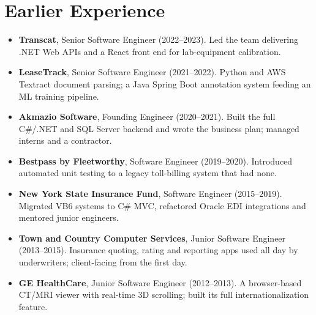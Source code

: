 \documentclass[10pt,letterpaper]{article}
\newcommand{\szmeta}{\fontsize{8pt}{10pt}\selectfont}
\begin{document}
\section*{Earlier Experience}
\begingroup\szmeta\begin{itemize}[leftmargin=11pt,labelsep=5pt,topsep=1pt,partopsep=0pt,parsep=0pt,itemsep=1pt]
\item \textbf{Transcat}, Senior Software Engineer {\color{muted}(2022--2023)}. Led the team delivering .NET Web APIs and a React front end for lab-equipment calibration.
\item \textbf{LeaseTrack}, Senior Software Engineer {\color{muted}(2021--2022)}. Python and AWS Textract document parsing; a Java Spring Boot annotation system feeding an ML training pipeline.
\item \textbf{Akmazio Software}, Founding Engineer {\color{muted}(2020--2021)}. Built the full C\#/.NET and SQL Server backend and wrote the business plan; managed interns and a contractor.
\item \textbf{Bestpass by Fleetworthy}, Software Engineer {\color{muted}(2019--2020)}. Introduced automated unit testing to a legacy toll-billing system that had none.
\item \textbf{New York State Insurance Fund}, Software Engineer {\color{muted}(2015--2019)}. Migrated VB6 systems to C\# MVC, refactored Oracle EDI integrations and mentored junior engineers.
\item \textbf{Town and Country Computer Services}, Junior Software Engineer {\color{muted}(2013--2015)}. Insurance quoting, rating and reporting apps used all day by underwriters; client-facing from the first day.
\item \textbf{GE HealthCare}, Junior Software Engineer {\color{muted}(2012--2013)}. A browser-based CT/MRI viewer with real-time 3D scrolling; built its full internationalization feature.
\end{itemize}\endgroup
\end{document}

